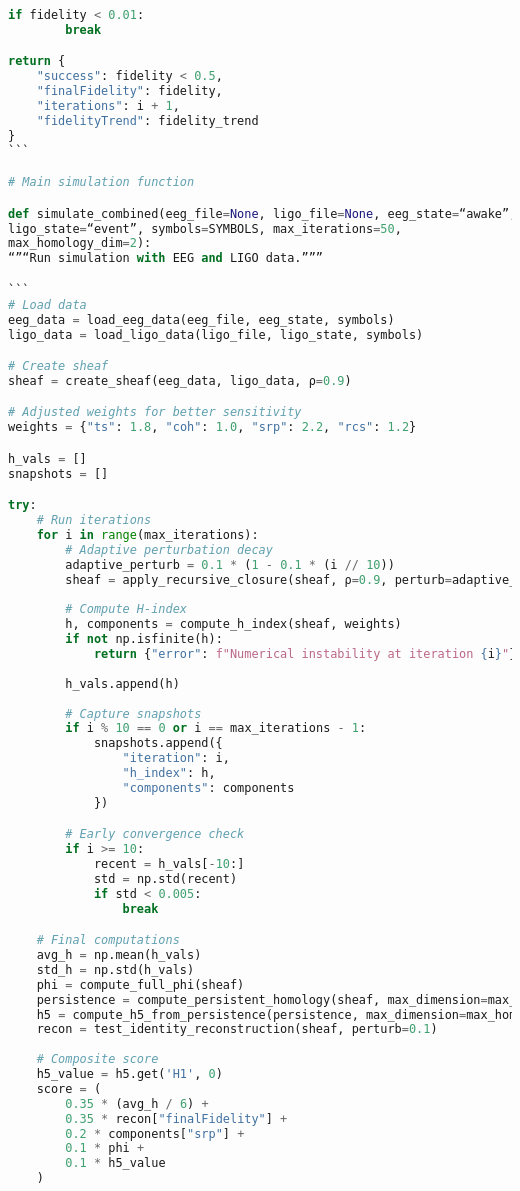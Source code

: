 \documentclass[11pt]{article}
\begin{document}
\begin{lstlisting}[language=Python, caption={EEG-LIGO Combined Analysis - Complete Code}]
    if fidelity < 0.01:
        break

return {
    "success": fidelity < 0.5,
    "finalFidelity": fidelity,
    "iterations": i + 1,
    "fidelityTrend": fidelity_trend
}
```

# Main simulation function

def simulate_combined(eeg_file=None, ligo_file=None, eeg_state=“awake”,
ligo_state=“event”, symbols=SYMBOLS, max_iterations=50,
max_homology_dim=2):
“”“Run simulation with EEG and LIGO data.”””

```
# Load data
eeg_data = load_eeg_data(eeg_file, eeg_state, symbols)
ligo_data = load_ligo_data(ligo_file, ligo_state, symbols)

# Create sheaf
sheaf = create_sheaf(eeg_data, ligo_data, ρ=0.9)

# Adjusted weights for better sensitivity
weights = {"ts": 1.8, "coh": 1.0, "srp": 2.2, "rcs": 1.2}

h_vals = []
snapshots = []

try:
    # Run iterations
    for i in range(max_iterations):
        # Adaptive perturbation decay
        adaptive_perturb = 0.1 * (1 - 0.1 * (i // 10))
        sheaf = apply_recursive_closure(sheaf, ρ=0.9, perturb=adaptive_perturb)
        
        # Compute H-index
        h, components = compute_h_index(sheaf, weights)
        if not np.isfinite(h):
            return {"error": f"Numerical instability at iteration {i}"}
        
        h_vals.append(h)
        
        # Capture snapshots
        if i % 10 == 0 or i == max_iterations - 1:
            snapshots.append({
                "iteration": i, 
                "h_index": h, 
                "components": components
            })

        # Early convergence check
        if i >= 10:
            recent = h_vals[-10:]
            std = np.std(recent)
            if std < 0.005:
                break

    # Final computations
    avg_h = np.mean(h_vals)
    std_h = np.std(h_vals)
    phi = compute_full_phi(sheaf)
    persistence = compute_persistent_homology(sheaf, max_dimension=max_homology_dim)
    h5 = compute_h5_from_persistence(persistence, max_dimension=max_homology_dim)
    recon = test_identity_reconstruction(sheaf, perturb=0.1)
    
    # Composite score
    h5_value = h5.get('H1', 0)
    score = (
        0.35 * (avg_h / 6) +
        0.35 * recon["finalFidelity"] +
        0.2 * components["srp"] +
        0.1 * phi +
        0.1 * h5_value
    )
    

\end{lstlisting}
\end{document}
